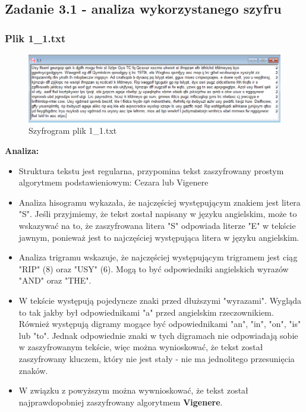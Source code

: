 \documentclass{article}
\begin{document}
\subsection*{Zadanie 3.1 - analiza wykorzystanego szyfru}
\subsubsection*{Plik 1\_1.txt}
\begin{figure}[H]
    \centering
    \includegraphics[width=\textwidth]{1_1.png}
    \caption{Szyfrogram plik 1\_1.txt}
\end{figure}
\textbf{Analiza:}
\begin{itemize}
    \item Struktura tekstu jest regularna, przypomina tekst zaszyfrowany prostym algorytmem podstawieniowym: Cezara lub Vigenere
    \item Analiza hisogramu wykazała, że najczęściej występującym znakiem jest litera "S". Jeśli przyjmiemy, że tekst został napisany w języku angielskim, może to wskazywać
    na to, że zaszyfrowana litera "S" odpowiada literze "E" w tekście jawnym, ponieważ jest to najczęściej występująca litera w języku angielskim.
    \item Analiza trigramu wskazuje, że najczęściej występującym trigramem jest ciąg "RIP" (8) oraz "USY" (6). Mogą to być odpowiedniki angielskich wyrazów "AND" oraz "THE".
    \item W tekście występują pojedyncze znaki przed dłuższymi "wyrazami". Wygląda to tak jakby był odpowiednikami "a" przed angielskim rzeczownikiem. Również występują
    digramy mogące być odpowiednikami "an", "in", "on", "is" lub "to". Jednak odpowiednie znaki w tych digramach nie odpowiadają sobie w zaszyfrowanym tekście, więc można
    wynioskować, że tekst został zaszyfrowany kluczem, który nie jest stały - nie ma jednolitego przesunięcia znaków.
    \item W związku z powyższym można wywnioskować, że tekst został najprawdopobniej zaszyfrowany algorytmem \textbf{Vigenere}.
\end{itemize}
\end{document}
